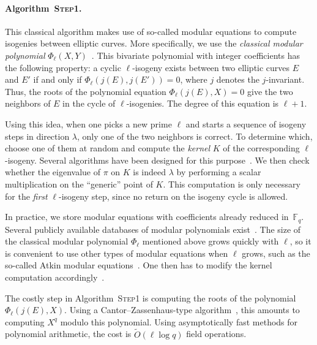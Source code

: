 \documentclass{article}
\newcommand{\F}{\mathbb{F}}
\newcommand{\softO}{\tilde{O}}
\newcommand{\algstyle}[1]{\textsc{#1}}
\theoremstyle{definition}
\begin{document}
\paragraph{Algorithm~\algstyle{Step1}.} This classical algorithm makes use
of so-called modular equations to compute isogenies between elliptic
curves. More specifically, we use the \emph{classical modular polynomial}
$\Phi_\ell(X, Y)$~\cite{todo:classicalmodpoly}.
This bivariate polynomial with integer coefficients has
the following property: a cyclic $\ell$-isogeny exists between two elliptic
curves $E$ and $E'$ if and only if $\Phi_\ell(j(E), j(E')) = 0$,
where $j$ denotes the $j$-invariant. Thus, the roots
of the polynomial equation $\Phi_\ell(j(E), X)=0$ give the two neighbors
of $E$ in the cycle of $\ell$-isogenies. The degree of this equation
is $\ell+1$.

Using this idea, when one picks a new prime $\ell$ and starts a sequence
of isogeny steps in direction $\lambda$, only one of the two neighbors is
correct. To determine which, choose one of them at random and
compute the \emph{kernel} $K$ of the corresponding $\ell$-isogeny. Several
algorithms have been designed for this purpose~\cite{todo:isogkernel}.
We then check whether the eigenvalue of $\pi$ on $K$ is indeed $\lambda$
by performing a scalar multiplication on the ``generic'' point of $K$.
This computation is only necessary for the \emph{first} $\ell$-isogeny
step, since no return on the isogeny cycle is allowed.

In practice, we store modular equations with coefficients already reduced
in~$\F_q$. Several publicly available databases of modular polynomials
exist~\cite{todo:modulardatabases}. The size of the classical modular polynomial
$\Phi_\ell$ mentioned above grows quickly with $\ell$, so it is convenient
to use other types of modular equations when $\ell$ grows, such as the so-called
Atkin modular equations~\cite{todo:atkinmodpoly}. One then has to
modify the kernel computation accordingly~\cite{todo:isogkernelatkin}.

The costly step in Algorithm~\algstyle{Step1} is computing the roots
of the polynomial $\Phi_\ell(j(E), X)$. Using a Cantor--Zassenhaus-type
algorithm~\cite{todo:canzass}, this amounts to computing $X^q$ modulo
this polynomial. Using asymptotically fast methods for polynomial
arithmetic, the cost is $\softO(\ell\log q)$ field operations.
\end{document}
